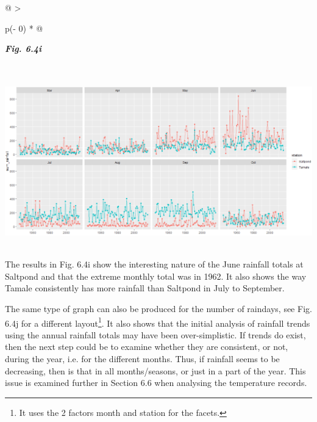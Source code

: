 \documentclass[
  letterpaper,
  DIV=11,
  numbers=noendperiod]{scrreprt}
\begin{document}
\begin{longtable}[]{@{}
  >{\raggedright\arraybackslash}p{(\columnwidth - 0\tabcolsep) * }@{}}
\toprule\noalign{}
\begin{minipage}[b]{\linewidth}\raggedright
\textbf{\emph{Fig. 6.4i}}
\end{minipage} \\
\midrule\noalign{}
\endhead
\bottomrule\noalign{}
\endlastfoot
\includegraphics[width=6.05397in,height=2.92973in]{figures/Fig6.4i.png} \\
\end{longtable}

The results in Fig. 6.4i show the interesting nature of the June
rainfall totals at Saltpond and that the extreme monthly total was in
1962. It also shows the way Tamale consistently has more rainfall than
Saltpond in July to September.

The same type of graph can also be produced for the number of raindays,
see Fig. 6.4j for a different layout\footnote{It uses the 2 factors
  month and station for the facets.}. It also shows that the initial
analysis of rainfall trends using the annual rainfall totals may have
been over-simplistic. If trends do exist, then the next step could be to
examine whether they are consistent, or not, during the year, i.e. for
the different months. Thus, if rainfall seems to be decreasing, then is
that in all months/seasons, or just in a part of the year. This issue is
examined further in Section 6.6 when analysing the temperature records.
\end{document}
